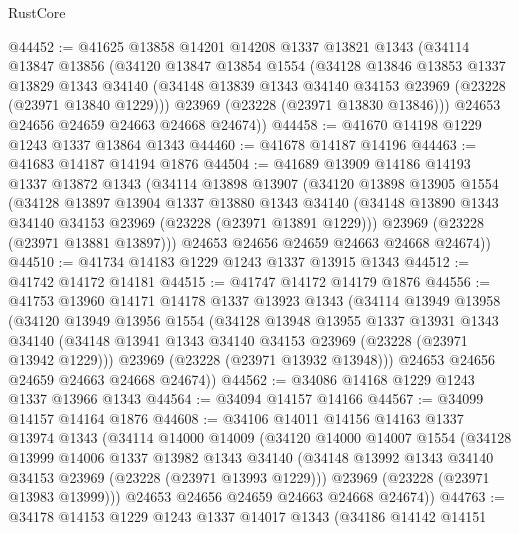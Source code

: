 \begin{lexlean}{RustCore}
\begin{coremodule}
@44452 := @41625
    @13858
    @14201
    @14208
    @1337
    @13821
    @1343
    (@34114
      @13847
      @13856
      (@34120
        @13847
        @13854
        @1554
        (@34128
          @13846
          @13853
          @1337
          @13829
          @1343
          @34140
          (@34148 @13839 @1343 @34140 @34153 @23969 (@23228 (@23971 @13840 @1229)))
          @23969
          (@23228 (@23971 @13830 @13846)))
        @24653
        @24656
        @24659
        @24663
        @24668
        @24674))
@44458 := @41670 @14198 @1229 @1243 @1337 @13864 @1343
@44460 := @41678 @14187 @14196
@44463 := @41683 @14187 @14194 @1876
@44504 := @41689
    @13909
    @14186
    @14193
    @1337
    @13872
    @1343
    (@34114
      @13898
      @13907
      (@34120
        @13898
        @13905
        @1554
        (@34128
          @13897
          @13904
          @1337
          @13880
          @1343
          @34140
          (@34148 @13890 @1343 @34140 @34153 @23969 (@23228 (@23971 @13891 @1229)))
          @23969
          (@23228 (@23971 @13881 @13897)))
        @24653
        @24656
        @24659
        @24663
        @24668
        @24674))
@44510 := @41734 @14183 @1229 @1243 @1337 @13915 @1343
@44512 := @41742 @14172 @14181
@44515 := @41747 @14172 @14179 @1876
@44556 := @41753
    @13960
    @14171
    @14178
    @1337
    @13923
    @1343
    (@34114
      @13949
      @13958
      (@34120
        @13949
        @13956
        @1554
        (@34128
          @13948
          @13955
          @1337
          @13931
          @1343
          @34140
          (@34148 @13941 @1343 @34140 @34153 @23969 (@23228 (@23971 @13942 @1229)))
          @23969
          (@23228 (@23971 @13932 @13948)))
        @24653
        @24656
        @24659
        @24663
        @24668
        @24674))
@44562 := @34086 @14168 @1229 @1243 @1337 @13966 @1343
@44564 := @34094 @14157 @14166
@44567 := @34099 @14157 @14164 @1876
@44608 := @34106
    @14011
    @14156
    @14163
    @1337
    @13974
    @1343
    (@34114
      @14000
      @14009
      (@34120
        @14000
        @14007
        @1554
        (@34128
          @13999
          @14006
          @1337
          @13982
          @1343
          @34140
          (@34148 @13992 @1343 @34140 @34153 @23969 (@23228 (@23971 @13993 @1229)))
          @23969
          (@23228 (@23971 @13983 @13999)))
        @24653
        @24656
        @24659
        @24663
        @24668
        @24674))
@44763 := @34178
    @14153
    @1229
    @1243
    @1337
    @14017
    @1343
    (@34186
      @14142
      @14151

\end{coremodule}
\end{lexlean}
